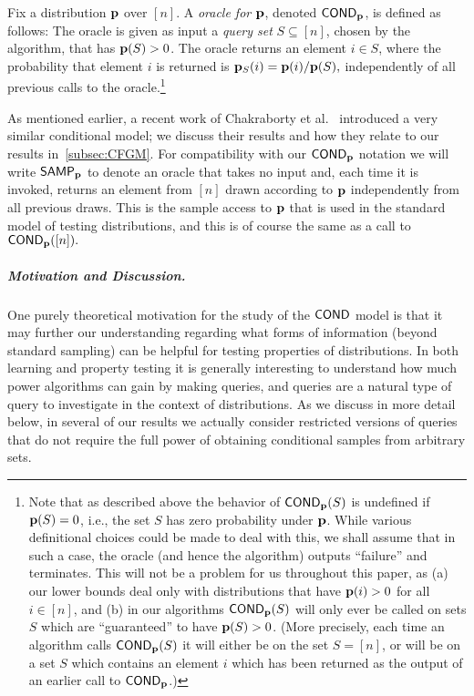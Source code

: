 \begin{definition} \label{def:cond}
Fix a distribution $\mathbf{p}$ over $[n]$.  A \emph{\COND oracle for $\mathbf{p}$}, denoted
${\sf COND}_{\mathbf{p}}$, is defined as follows:
 The oracle is given as input a \emph{query set}
 $S \subseteq [n]$, chosen by the algorithm, that has $\mathbf{p}(S) > 0$. The oracle returns an element $i \in S$, where
 the probability that element $i$ is returned is $\mathbf{p}_S(i) = \mathbf{p}(i)/\mathbf{p}(S),$
 independently of all previous calls to the oracle.\footnote{Note that
as described above the behavior of ${\sf COND}_{\mathbf{p}}(S)$ is undefined if $\mathbf{p}(S)=0$,
i.e., the set $S$ has zero probability under $\mathbf{p}$.  While various definitional choices could be made to deal with this,
{we shall assume that in such a case, the oracle (and hence the algorithm)
outputs ``failure'' and terminates. This will not be a problem
for us throughout this paper, as}
(a)  our lower bounds  deal only with distributions that have
$\mathbf{p}(i)>0$ for all $i \in [n]$, and (b) in  our algorithms ${\sf COND}_{\mathbf{p}}(S)$ will only ever be
called on sets $S$ which are ``guaranteed'' to have $\mathbf{p}(S)>0$.  (More precisely, each time
an algorithm calls ${\sf COND}_{\mathbf{p}}(S)$ it will either be on the set $S=[n]$, or
will be on a set $S$ which contains an element $i$ which
has been returned as the output of an earlier call to ${\sf COND}_{\mathbf{p}}$.)}
\end{definition}

As mentioned earlier, a recent work of Chakraborty et al.~\cite{CFGM:13} introduced a very similar conditional model; we discuss their results and how
they relate to our results in~\cref{subsec:CFGM}.
For compatibility with our ${\sf COND}_{\mathbf{p}}$ notation we will write ${\sf SAMP}_{\mathbf{p}}$ to
denote an oracle that takes no input and, each time it is invoked, returns
an element from $[n]$ drawn according to $\mathbf{p}$ independently from
all previous draws.  This is the sample access to
$\mathbf{p}$ that is used in the standard model of testing distributions, and
this is of course the same as a call to ${\sf COND}_{\mathbf{p}}([n]).$

\subparagraph{Motivation and Discussion.}
One purely theoretical motivation for the study of the ${\sf COND}$ model
is that it may further our understanding regarding what forms of information
(beyond standard sampling) can be helpful for testing properties of
distributions.  In both learning and property testing
it is generally interesting to understand how much power algorithms
can gain by making queries,
        and \COND queries are a natural type of query to investigate
in the context of distributions. As we discuss in more detail below,
in several of our results we actually consider restricted versions of \COND
queries that do not require the full power of obtaining conditional samples
from arbitrary sets.

